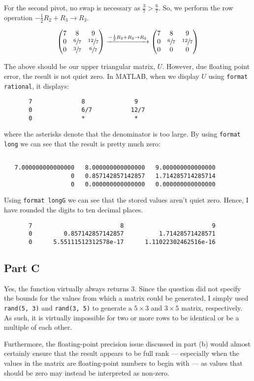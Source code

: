 \documentclass[12pt]{article}
\newcommand{\code}[1]{\texttt{#1}}
\begin{document}
For the second pivot, no swap is necessary as $\frac{3}{7}>\frac{6}{7}$. So, we perform the row operation $-\frac{1}{2}R_2 + R_3 \to R_3$.

$$
\begin{pmatrix}
     7 & 8 & 9 \\
     0 & \sfrac{6}{7} & \sfrac{12}{7} \\
     0 & \sfrac{3}{7} & \sfrac{6}{7}
\end{pmatrix}
\xrightarrow[]{-\frac{1}{2}R_2 + R_3 \to R_3}
\begin{pmatrix}
     7 & 8 & 9 \\
     0 & \sfrac{6}{7} & \sfrac{12}{7} \\
     0 & 0 & 0
\end{pmatrix}
$$

The above should be our upper triangular matrix, $U$. However, due floating point error, the result is not quiet zero. In MATLAB, when we display $U$ using \code{format rational}, it displays:

\begin{verbatim}
       7              8              9       
       0              6/7           12/7     
       0              *              *   
\end{verbatim}

where the asterisks denote that the denominator is too large. By using \code{format long} we can see that the result is pretty much zero:

\begin{verbatim}
    
   7.000000000000000   8.000000000000000   9.000000000000000
                   0   0.857142857142857   1.714285714285714
                   0   0.000000000000000   0.000000000000000
\end{verbatim}

Using \code{format longG} we can see that the stored values aren't quiet zero. Hence, I have rounded the digits to ten decimal places.

\begin{verbatim}
       7                         8                         9
       0         0.857142857142857          1.71428571428571
       0      5.55111512312578e-17      1.11022302462516e-16
\end{verbatim}

\subsection*{Part C}

Yes, the function virtually always returns 3. Since the question did not specify the bounds for the values from which a matrix could be generated, I simply used \code{rand(5, 3)} and \code{rand(3, 5)} to generate a $5\times3$ and $3\times5$ matrix, respectively. As such, it is virtually impossible for two or more rows to be identical or be a multiple of each other.

Furthermore, the floating-point precision issue discussed in part (b) would almost certainly ensure that the result appears to be full rank --- especially when the values in the matrix are floating-point numbers to begin with --- as values that should be zero may instead be interpreted as non-zero.
\end{document}
